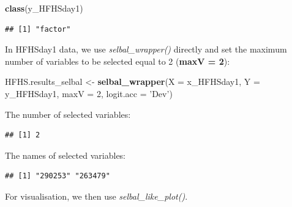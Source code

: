 \documentclass[openany]{book}
\newenvironment{Shaded}{\begin{snugshade}}{\end{snugshade}}
\newcommand{\KeywordTok}[1]{\textcolor[rgb]{0.13,0.29,0.53}{\textbf{#1}}}
\newcommand{\DataTypeTok}[1]{\textcolor[rgb]{0.13,0.29,0.53}{#1}}
\newcommand{\DecValTok}[1]{\textcolor[rgb]{0.00,0.00,0.81}{#1}}
\newcommand{\StringTok}[1]{\textcolor[rgb]{0.31,0.60,0.02}{#1}}
\newcommand{\OperatorTok}[1]{\textcolor[rgb]{0.81,0.36,0.00}{\textbf{#1}}}
\newcommand{\NormalTok}[1]{#1}
\begin{document}
\begin{Shaded}
\begin{Highlighting}[]
\KeywordTok{class}\NormalTok{(y_HFHSday1)}
\end{Highlighting}
\end{Shaded}

\begin{verbatim}
## [1] "factor"
\end{verbatim}

In HFHSday1 data, we use \emph{selbal\_wrapper()} directly and set the
maximum number of variables to be selected equal to 2 (\textbf{maxV =
2}):

\begin{Shaded}
\begin{Highlighting}[]
\NormalTok{HFHS.results_selbal <-}\StringTok{ }\KeywordTok{selbal_wrapper}\NormalTok{(}\DataTypeTok{X =}\NormalTok{ x_HFHSday1, }\DataTypeTok{Y =}\NormalTok{ y_HFHSday1, }
                                      \DataTypeTok{maxV =} \DecValTok{2}\NormalTok{, }\DataTypeTok{logit.acc =} \StringTok{'Dev'}\NormalTok{) }
\end{Highlighting}
\end{Shaded}

The number of selected variables:

\begin{Shaded}
\end{Shaded}

\begin{verbatim}
## [1] 2
\end{verbatim}

The names of selected variables:

\begin{Shaded}
\end{Shaded}

\begin{verbatim}
## [1] "290253" "263479"
\end{verbatim}

For visualisation, we then use \emph{selbal\_like\_plot()}.
\end{document}
